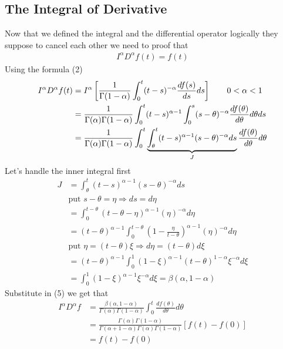 \documentclass[]{article}
\begin{document}
\subsection{The Integral of Derivative}
Now that we defined the integral and the differential operator logically they suppose to cancel each other
we need to proof that
\begin{align*}
    I^{\alpha}D^{\alpha}f(t) = f(t)
\end{align*}
Using the formula (2)
\begin{align}
    \notag
    I^{\alpha}D^{\alpha}f(t) & = I^{\alpha}\left[\frac{1}{\Gamma(1-\alpha)}\int_{0}^{t}(t-s)^{-\alpha}\frac{d f(s)}{ds}ds\right] \qquad 0 < \alpha < 1
    \\\notag
                             & = \frac{1}{\Gamma(\alpha)\Gamma(1-\alpha)} \int_{0}^{t}(t-s)^{\alpha-1} \int_{0}^{s}(s-\theta)^{-\alpha} \frac{d f(\theta)}{d\theta} d\theta ds
    \\
                             & = \frac{1}{\Gamma(\alpha)\Gamma(1-\alpha)} \int_{0}^{t}\underbrace{\int_{\theta}^{t}(t-s)^{\alpha-1}(s-\theta)^{-\alpha} ds}_J  \frac{d f(\theta)}{d\theta} d\theta
\end{align}
Let's handle the inner integral first
\begin{align*}
    J & = \int_{\theta}^{t}(t-s)^{\alpha-1}(s-\theta)^{-\alpha} ds
    \\
      & \text{put } s-\theta = \eta \Longrightarrow ds = d\eta
    \\
      & = \int_{0}^{t-\theta}(t-\theta-\eta)^{\alpha-1}(\eta)^{-\alpha} d\eta
    \\
      & = (t-\theta)^{\alpha-1} \int_{0}^{t-\theta}(1-\frac{\eta}{t-\theta})^{\alpha-1}(\eta)^{-\alpha} d\eta
    \\
      & \text{put } \eta = (t-\theta)\xi  \Longrightarrow d\eta = (t-\theta)d\xi
    \\
      & = (t-\theta)^{\alpha-1} \int_{0}^{1}(1-\xi)^{\alpha-1} (t-\theta)^{1-\alpha} \xi^{-\alpha} d\xi
    \\
      & = \int_{0}^{1}(1-\xi)^{\alpha-1} \xi^{-\alpha} d\xi = \beta(\alpha,1-\alpha)
\end{align*}
Substitute in (5) we get that
\begin{align*}
    I^{\alpha}D^{\alpha}f & = \frac{\beta(\alpha,1-\alpha)}{\Gamma(\alpha)\Gamma(1-\alpha)}\int_{0}^{t}\frac{d f(\theta)}{d\theta} d\theta
    \\
                          & = \frac{\Gamma(\alpha)\Gamma(1-\alpha)}{\Gamma(\alpha+1-\alpha)\Gamma(\alpha)\Gamma(1-\alpha)}[f(t)-f(0)]
    \\
                          & = f(t)-f(0)
\end{align*}
\setcounter{equation}{0}
\newpage
\end{document}
